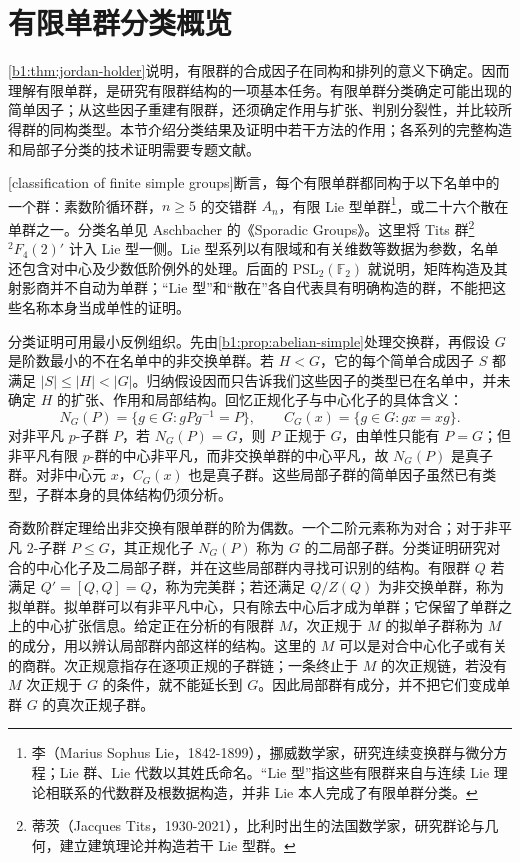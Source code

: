 
\section{有限单群分类概览}
\label{b1:sec:C04}

\cref{b1:thm:jordan-holder}说明，有限群的合成因子在同构和排列的意义下确定。因而理解有限单群，是研究有限群结构的一项基本任务。有限单群分类确定可能出现的简单因子；从这些因子重建有限群，还须确定作用与扩张、判别分裂性，并比较所得群的同构类型。本节介绍分类结果及证明中若干方法的作用；各系列的完整构造和局部子分类的技术证明需要专题文献。

\ProseParagraphBreak
{}[classification of finite simple groups]断言，每个有限单群都同构于以下名单中的一个群：素数阶循环群，\(n\geq5\) 的交错群 \(A_n\)，有限 Lie 型单群\footnote{李（Marius Sophus Lie，1842-1899），挪威数学家，研究连续变换群与微分方程；Lie 群、Lie 代数以其姓氏命名。“Lie 型”指这些有限群来自与连续 Lie 理论相联系的代数群及根数据构造，并非 Lie 本人完成了有限单群分类。}，或二十六个散在单群之一。分类名单见 Aschbacher 的《Sporadic Groups》\cite[Preface, pp. ix--xi]{Aschbacher1994SporadicGroups}。这里将 Tits 群\footnote{蒂茨（Jacques Tits，1930-2021），比利时出生的法国数学家，研究群论与几何，建立建筑理论并构造若干 Lie 型群。} \({}^2F_4(2)'\) 计入 Lie 型一侧。Lie 型系列以有限域和有关维数等数据为参数，名单还包含对中心及少数低阶例外的处理。后面的 \(\mathrm{PSL}_2(\mathbb F_2)\) 就说明，矩阵构造及其射影商并不自动为单群；“Lie 型”和“散在”各自代表具有明确构造的群，不能把这些名称本身当成单性的证明。

\ProseParagraphBreak
分类证明可用最小反例组织。先由\cref{b1:prop:abelian-simple}处理交换群，再假设 \(G\) 是阶数最小的不在名单中的非交换单群。若 \(H<G\)，它的每个简单合成因子 \(S\) 都满足 \(|S|\leq|H|<|G|\)。归纳假设因而只告诉我们这些因子的类型已在名单中，并未确定 \(H\) 的扩张、作用和局部结构。回忆正规化子与中心化子的具体含义：
\[
	N_G(P)=\{g\in G:gPg^{-1}=P\},\qquad C_G(x)=\{g\in G:gx=xg\}.
\]
对非平凡 \(p\)-子群 \(P\)，若 \(N_G(P)=G\)，则 \(P\) 正规于 \(G\)，由单性只能有 \(P=G\)；但非平凡有限 \(p\)-群的中心非平凡，而非交换单群的中心平凡，故 \(N_G(P)\) 是真子群。对非中心元 \(x\)，\(C_G(x)\) 也是真子群。这些局部子群的简单因子虽然已有类型，子群本身的具体结构仍须分析。

\ProseParagraphBreak
奇数阶群定理给出非交换有限单群的阶为偶数。一个二阶元素称为对合；对于非平凡 \(2\)-子群 \(P\leq G\)，其正规化子 \(N_G(P)\) 称为 \(G\) 的二局部子群。分类证明研究对合的中心化子及二局部子群，并在这些局部群内寻找可识别的结构。有限群 \(Q\) 若满足 \(Q'=[Q,Q]=Q\)，称为完美群；若还满足 \(Q/Z(Q)\) 为非交换单群，称为拟单群。拟单群可以有非平凡中心，只有除去中心后才成为单群；它保留了单群之上的中心扩张信息。给定正在分析的有限群 \(M\)，次正规于 \(M\) 的拟单子群称为 \(M\) 的成分，用以辨认局部群内部这样的结构。这里的 \(M\) 可以是对合中心化子或有关的商群。次正规意指存在逐项正规的子群链；一条终止于 \(M\) 的次正规链，若没有 \(M\) 次正规于 \(G\) 的条件，就不能延长到 \(G\)。因此局部群有成分，并不把它们变成单群 \(G\) 的真次正规子群。

